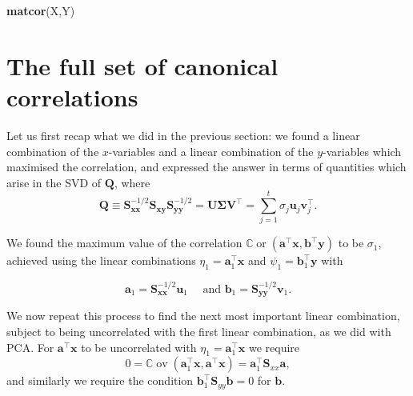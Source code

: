 \documentclass[]{book}
\newenvironment{Shaded}{\begin{snugshade}}{\end{snugshade}}
\newcommand{\KeywordTok}[1]{\textcolor[rgb]{0.13,0.29,0.53}{\textbf{#1}}}
\newcommand{\NormalTok}[1]{#1}
\theoremstyle{definition}
\theoremstyle{definition}
\theoremstyle{definition}
\theoremstyle{remark}
\begin{document}
\begin{Shaded}
\begin{Highlighting}[]
\KeywordTok{matcor}\NormalTok{(X,Y)}
\end{Highlighting}
\end{Shaded}

\hypertarget{the-full-set-of-canonical-correlations}{%
\section{The full set of canonical correlations}\label{the-full-set-of-canonical-correlations}}

Let us first recap what we did in the previous section: we found a linear combination of the \(x\)-variables and a linear combination of the \(y\)-variables which
maximised the correlation, and expressed the answer in terms of quantities which arise in the SVD of \(\boldsymbol Q\), where
\[
\boldsymbol Q\equiv \boldsymbol S_{\boldsymbol x\boldsymbol x}^{-1/2} \boldsymbol S_{\boldsymbol x\boldsymbol y}\boldsymbol S_{\boldsymbol y\boldsymbol y}^{-1/2}=\boldsymbol U{\pmb \Sigma} \boldsymbol V^\top=\sum_{j=1}^t \sigma_j \boldsymbol u_j \boldsymbol v_j^\top.
\]

We found the maximum value of the correlation \({\mathbb{C}\operatorname{or}}(\boldsymbol a^\top\boldsymbol x, \boldsymbol b^\top\boldsymbol y)\) to be \(\sigma_1\), achieved using the linear combinations \(\eta_1=\boldsymbol a_1^\top \boldsymbol x\) and \(\psi_1=\boldsymbol b_1^\top \boldsymbol y\) with

\[\boldsymbol a_1=\boldsymbol S_{\boldsymbol x\boldsymbol x}^{-1/2}\boldsymbol u_1 \quad\mbox{ and } \boldsymbol b_1=\boldsymbol S_{\boldsymbol y\boldsymbol y}^{-1/2}\boldsymbol v_1.\]

We now repeat this process to find the next most important linear combination, subject to being uncorrelated with the first linear combination, as we did with PCA. For \(\boldsymbol a^\top \boldsymbol x\) to be uncorrelated with \(\eta_1 = \boldsymbol a_1^\top \boldsymbol x\) we require
\[0 = {\mathbb{C}\operatorname{ov}}(\boldsymbol a_1^\top \boldsymbol x, \boldsymbol a^\top \boldsymbol x) = \boldsymbol a_1^\top \boldsymbol S_{xx}\boldsymbol a,\]
and similarly we require the condition \(\boldsymbol b_1^\top \boldsymbol S_{yy} \boldsymbol b=0\) for \(\boldsymbol b\).
\end{document}
